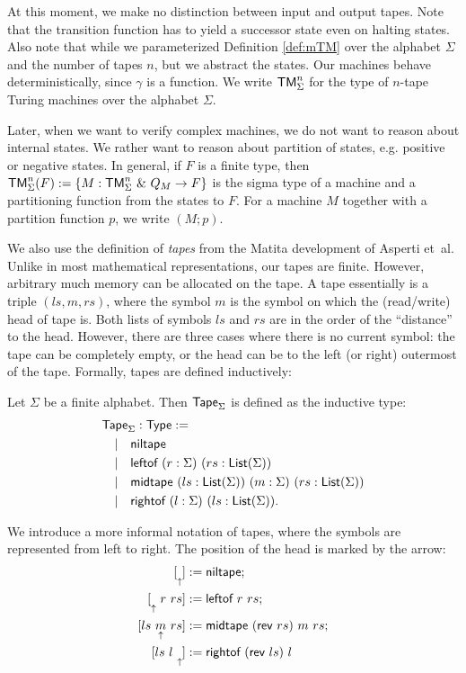 \documentclass{psartcl}
\begin{document}
At this moment, we make no distinction between input and output tapes.  Note that the transition function has to yield a successor state even on
halting states.  Also note that while we parameterized Definition \ref{def:mTM} over the alphabet $\Sigma$ and the number of tapes $n$, but we
abstract the states.  Our machines behave deterministically, since $\gamma$ is a function.  We write $\textsf{TM}_\Sigma^n$ for the type of $n$-tape
Turing machines over the alphabet $\Sigma$.

Later, when we want to verify complex machines, we do not want to reason about internal states.  We rather want to reason about partition of states,
e.g. positive or negative states.  In general, if $F$ is a finite type, then
$\textsf{TM}_\Sigma^n(F) := \left\{ M:\textsf{TM}_\Sigma^n ~\&~ Q_M \rightarrow F \right\}$ is the sigma type of a machine and a partitioning function from the states
to $F$.  For a machine $M$ together with a partition function $p$, we write $(M; p)$.

We also use the definition of \emph{tapes} from the Matita development of Asperti et~al.  Unlike in most mathematical representations, our tapes are
finite.  However, arbitrary much memory can be allocated on the tape.  A tape essentially is a triple $(ls,m,rs)$, where the symbol $m$ is the symbol
on which the (read/write) head of tape is.  Both lists of symbols $ls$ and $rs$ are in the order of the ``distance'' to the head.  However, there are
three cases where there is no current symbol: the tape can be completely empty, or the head can be to the left (or right) outermost of the tape.
Formally, tapes are defined inductively:

\begin{definition}[Tape]
  \label{def:tape}
  Let $\Sigma$ be a finite alphabet.  Then $\textsf{Tape}_\Sigma$ is defined as the inductive type:
  \begin{align*}
    & \textsf{Tape}_\Sigma : \textsf{Type} := \\
    & \quad | \quad \textsf{niltape} \\
    & \quad | \quad \textsf{leftof}  ~ (r:\Sigma) ~ (rs:\textsf{List}(\Sigma)) \\
    & \quad | \quad \textsf{midtape} ~ (ls:\textsf{List}(\Sigma)) ~ (m:\Sigma) ~ (rs:\textsf{List}(\Sigma)) \\
    & \quad | \quad \textsf{rightof} ~ (l:\Sigma) ~ (ls:\textsf{List}(\Sigma)).
  \end{align*}
\end{definition}


We introduce a more informal notation of tapes, where the symbols are represented from left to right.  The position of the head is marked by the
arrow:
\begin{align*}
  \niltape &:= \MS{niltape} ;\\
  \leftof{r}{rs} &:= \MS{leftof}~r~rs ;\\
  \midtape{ls}{m}{rs} &:= \MS{midtape}~(\rev~rs)~m~rs ;\\
  \rightof{ls}{l} &:= \MS{rightof}~(\rev~ls)~l
\end{align*}
\end{document}
